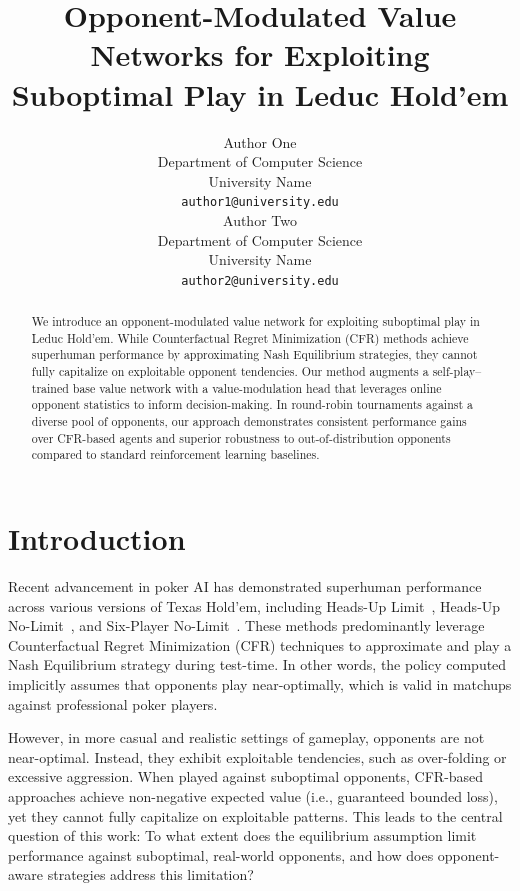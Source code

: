 \documentclass{article}
\title{Opponent-Modulated Value Networks for Exploiting\\
       Suboptimal Play in Leduc Hold'em}
\author{%
  Author One \\
  Department of Computer Science \\
  University Name \\
  \texttt{author1@university.edu} \\
  \And
  Author Two \\
  Department of Computer Science \\
  University Name \\
  \texttt{author2@university.edu} \\
}
\begin{document}
\maketitle

\begin{abstract}
We introduce an opponent-modulated value network for exploiting suboptimal play in Leduc Hold'em. While Counterfactual Regret Minimization (CFR) methods achieve superhuman performance by approximating Nash Equilibrium strategies, they cannot fully capitalize on exploitable opponent tendencies. Our method augments a self-play--trained base value network with a value-modulation head that leverages online opponent statistics to inform decision-making. In round-robin tournaments against a diverse pool of opponents, our approach demonstrates consistent performance gains over CFR-based agents and superior robustness to out-of-distribution opponents compared to standard reinforcement learning baselines.
\end{abstract}

\section{Introduction}

Recent advancement in poker AI has demonstrated superhuman performance across various versions of Texas Hold'em, including Heads-Up Limit~\citep{ref1}, Heads-Up No-Limit~\citep{ref2,ref3,ref6}, and Six-Player No-Limit~\citep{ref4}. These methods predominantly leverage Counterfactual Regret Minimization (CFR) techniques to approximate and play a Nash Equilibrium strategy during test-time. In other words, the policy computed implicitly assumes that opponents play near-optimally, which is valid in matchups against professional poker players.

However, in more casual and realistic settings of gameplay, opponents are not near-optimal. Instead, they exhibit exploitable tendencies, such as over-folding or excessive aggression. When played against suboptimal opponents, CFR-based approaches achieve non-negative expected value (i.e., guaranteed bounded loss), yet they cannot fully capitalize on exploitable patterns. This leads to the central question of this work: To what extent does the equilibrium assumption limit performance against suboptimal, real-world opponents, and how does opponent-aware strategies address this limitation?
\end{document}
